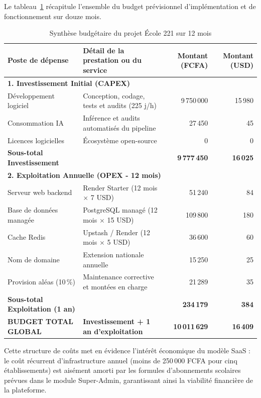Le tableau~\ref{tab:synthese-couts} récapitule l'ensemble du budget prévisionnel d'implémentation et de fonctionnement sur douze mois.

\begin{table}[h]
\centering
\small
\begin{tabular}{lp{6cm}rr}
\toprule
\textbf{Poste de dépense} & \textbf{Détail de la prestation ou du service} & \textbf{Montant (FCFA)} & \textbf{Montant (USD)} \\
\midrule
\multicolumn{4}{l}{\textbf{1. Investissement Initial (CAPEX)}} \\
Développement logiciel & Conception, codage, tests et audits (225 j/h) & 9\,750\,000 & 15\,980 \\
Consommation IA & Inférence et audits automatisés du pipeline & 27\,450 & 45 \\
Licences logicielles & Écosystème open-source & 0 & 0 \\
\midrule
\textbf{Sous-total Investissement} & & \textbf{9\,777\,450} & \textbf{16\,025} \\
\midrule
\multicolumn{4}{l}{\textbf{2. Exploitation Annuelle (OPEX - 12 mois)}} \\
Serveur web backend & Render Starter (12 mois $\times$ 7 USD) & 51\,240 & 84 \\
Base de données managée & PostgreSQL managé (12 mois $\times$ 15 USD) & 109\,800 & 180 \\
Cache Redis & Upstash / Render (12 mois $\times$ 5 USD) & 36\,600 & 60 \\
Nom de domaine & Extension nationale annuelle & 15\,250 & 25 \\
Provision aléas (10\,\%) & Maintenance corrective et montées en charge & 21\,289 & 35 \\
\midrule
\textbf{Sous-total Exploitation (1 an)} & & \textbf{234\,179} & \textbf{384} \\
\midrule
\textbf{BUDGET TOTAL GLOBAL} & \textbf{Investissement + 1 an d'exploitation} & \textbf{10\,011\,629} & \textbf{16\,409} \\
\bottomrule
\end{tabular}
\caption{Synthèse budgétaire du projet École 221 sur 12 mois}
\label{tab:synthese-couts}
\end{table}

\noindent
Cette structure de coûts met en évidence l'intérêt économique du modèle SaaS : le coût récurrent d'infrastructure annuel (moins de 250\,000 FCFA pour cinq établissements) est aisément amorti par les formules d'abonnements scolaires prévues dans le module Super-Admin, garantissant ainsi la viabilité financière de la plateforme.
